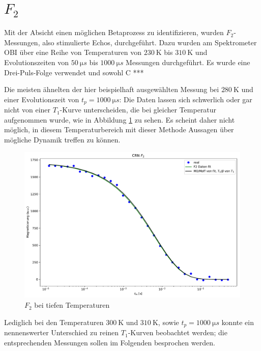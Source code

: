 \section{$F_2$} \label{section:res:F_2}

Mit der Absicht einen möglichen Betaprozess zu identifizieren, wurden $F_2$-Messungen, also stimulierte Echos, durchgeführt. Dazu wurden am Spektrometer OBI über eine Reihe von Temperaturen von $\SI{230}{\kelvin}$ bis $\SI{310}{\kelvin}$ und Evolutionszeiten von $\SI{50}{\micro s}$ bis $\SI{1000}{\micro s}$ Messungen durchgeführt. Es wurde eine Drei-Puls-Folge verwendet und sowohl C ***

Die meisten ähnelten der hier beispielhaft ausgewählten Messung bei $\SI{280}{\kelvin}$ und einer Evolutionszeit von $t_p = \SI{1000}{\micro s}$: Die Daten lassen sich schwerlich oder gar nicht von einer $T_1$-Kurve unterscheiden, die bei gleicher Temperatur aufgenommen wurde, wie in Abbildung \ref{fig:res:F_2_tieftemp} zu sehen. Es scheint daher nicht möglich, in diesem Temperaturbereich mit dieser Methode Aussagen über mögliche Dynamik treffen zu können.
\begin{figure}
	\begin{center}
		\includegraphics[width=\textwidth]{graphics/plots/F2/f2_tieftemp.pdf}
	\end{center}
	\caption{$F_2$ bei tiefen Temperaturen} \label{fig:res:F_2_tieftemp}
\end{figure}

Lediglich bei den Temperaturen $\SI{300}{\kelvin}$ und $\SI{310}{\kelvin}$, sowie $t_p = \SI{1000}{\micro s}$ konnte ein nennenswerter Unterschied zu reinen $T_1$-Kurven beobachtet werden; die entsprechenden Messungen sollen im Folgenden besprochen werden.

